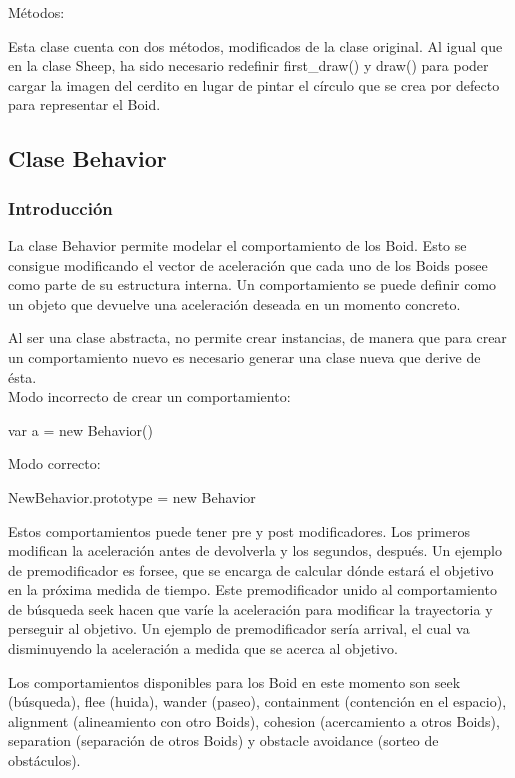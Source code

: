 Métodos:

Esta clase cuenta con dos métodos, modificados de la clase original. Al igual que en la clase Sheep, ha sido necesario redefinir 
first\_draw() y draw() para poder cargar la imagen del cerdito en lugar de pintar el círculo que se crea por defecto para representar el 
Boid.



\subsection{Clase Behavior}
\label{subsection:behavior_section}

\subsubsection{Introducción}
\label{subsubsection:behavior}

La clase Behavior permite modelar el comportamiento de los Boid. Esto se consigue modificando el vector de aceleración que cada uno de los 
Boids posee como parte de su estructura interna. Un comportamiento se puede definir como un objeto que devuelve una aceleración deseada en 
un momento concreto.

Al ser una clase abstracta, no permite crear instancias, de manera que para crear un comportamiento nuevo es necesario generar una clase 
nueva que derive de ésta.\\

Modo incorrecto de crear un comportamiento:

var a = new Behavior()

Modo correcto:

NewBehavior.prototype = new Behavior

Estos comportamientos puede tener pre y post modificadores. Los primeros modifican la aceleración antes de devolverla y los segundos,
después. Un ejemplo de premodificador es forsee, que se encarga de calcular dónde estará el objetivo en la próxima medida de tiempo. Este 
premodificador unido al comportamiento de búsqueda seek hacen que varíe la aceleración para modificar la trayectoria y perseguir al objetivo. 
Un ejemplo de premodificador sería arrival, el cual va disminuyendo la aceleración a medida que se acerca al objetivo.

Los comportamientos disponibles para los Boid en este momento son seek (búsqueda), flee (huida), wander (paseo), containment (contención 
en el espacio), alignment (alineamiento con otro Boids), cohesion (acercamiento a otros Boids), separation (separación de otros Boids) y 
obstacle avoidance (sorteo de obstáculos).\\

